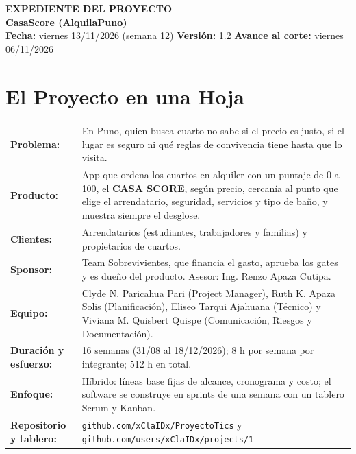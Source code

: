 \documentclass[11pt,a4paper]{article}
\begin{document}
\begin{center}
    {\Large \textbf{\textcolor{AzulUNA}{EXPEDIENTE DEL PROYECTO}}}\\[3pt]
    {\normalsize \textbf{CasaScore (AlquilaPuno)}}\\[4pt]
    \footnotesize \textbf{Fecha:} viernes 13/11/2026 (semana 12) \quad \textbar\quad \textbf{Versión:} 1.2 \quad \textbar\quad \textbf{Avance al corte:} viernes 06/11/2026
\end{center}

\section{El Proyecto en una Hoja}
{\small
\noindent\begin{tabularx}{\textwidth}{@{}P{3.4cm} L@{}}
\toprule
\textbf{Problema:} & En Puno, quien busca cuarto no sabe si el precio es justo, si el lugar es seguro ni qué reglas de convivencia tiene hasta que lo visita. \\
\textbf{Producto:} & App que ordena los cuartos en alquiler con un puntaje de 0 a 100, el \textbf{CASA SCORE}, según precio, cercanía al punto que elige el arrendatario, seguridad, servicios y tipo de baño, y muestra siempre el desglose. \\
\textbf{Clientes:} & Arrendatarios (estudiantes, trabajadores y familias) y propietarios de cuartos. \\
\textbf{Sponsor:} & Team Sobrevivientes, que financia el gasto, aprueba los gates y es dueño del producto. Asesor: Ing. Renzo Apaza Cutipa. \\
\textbf{Equipo:} & Clyde N. Paricahua Pari (Project Manager), Ruth K. Apaza Solis (Planificación), Eliseo Tarqui Ajahuana (Técnico) y Viviana M. Quisbert Quispe (Comunicación, Riesgos y Documentación). \\
\textbf{Duración y esfuerzo:} & 16 semanas (31/08 al 18/12/2026); 8 h por semana por integrante; 512 h en total. \\
\textbf{Enfoque:} & Híbrido: líneas base fijas de alcance, cronograma y costo; el software se construye en sprints de una semana con un tablero Scrum y Kanban. \\
\textbf{Repositorio y tablero:} & \texttt{github.com/xClaIDx/ProyectoTics} y \texttt{github.com/users/xClaIDx/projects/1} \\
\bottomrule
\end{tabularx}
}
\end{document}
